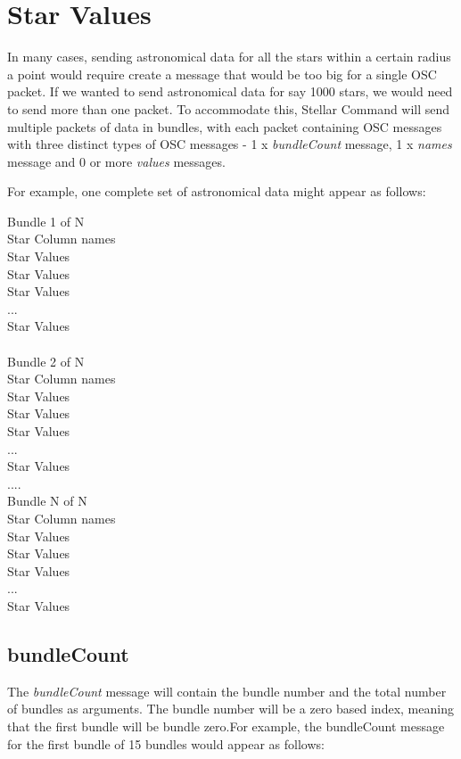 \section{Star Values}
In many cases, sending astronomical data for all the stars within a certain radius a point would require create a message that would be too big for a single OSC packet. If we wanted to send astronomical data for say 1000 stars, we would need to send more than one packet. To accommodate this, Stellar Command will send multiple packets of data in bundles, with each packet containing OSC messages with  three distinct types of OSC messages - 1 x \textit{bundleCount} message, 1 x \textit{names} message and 0 or more \textit{values} messages. 

For example, one complete set of astronomical data might appear as follows:

\begin{syntax}
	Bundle 1 of N\\
	Star Column names\\
	Star Values \\
	Star Values \\
	Star Values \\
	...\\
	Star Values \\
	\\
	Bundle 2 of N\\
	Star Column names\\
	Star Values \\
	Star Values \\
	Star Values \\
	...\\
	Star Values \\
	
	....\\
	Bundle N of N\\
	Star Column names\\
	Star Values \\
	Star Values \\
	Star Values \\
	...\\
	Star Values \\
	
\end{syntax}

\subsection{bundleCount}
The \textit{bundleCount} message will contain the bundle number and the total number of bundles as arguments. The bundle number will be a zero based index, meaning that the first bundle will be bundle zero.For example, the bundleCount message for the first bundle of 15 bundles would appear as follows:

